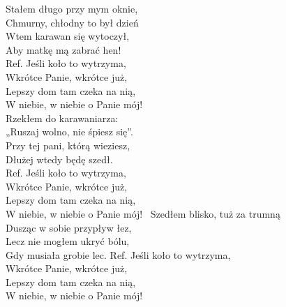 \begin{flushleft}
Stałem długo przy mym oknie, \\
Chmurny, chłodny to był dzień \\
Wtem karawan się wytoczył, \tab{}\\
Aby matkę mą zabrać hen! \tab{}\\
\hops
Ref. Jeśli koło to wytrzyma, \tab{}\\
\hspace{0.9cm}Wkrótce Panie, wkrótce już,\\
\hspace{0.9cm}Lepszy dom tam czeka na nią,\\
\hspace{0.9cm}W niebie, w niebie o Panie mój!\\
\hops
Rzekłem do karawaniarza:\\
„Ruszaj wolno, nie śpiesz się”.\\
Przy tej pani, którą wieziesz,\\
Dłużej wtedy będę szedł.\\
\hops
Ref. Jeśli koło to wytrzyma,\\
\hspace{0.9cm}Wkrótce Panie, wkrótce już,\\
\hspace{0.9cm}Lepszy dom tam czeka na nią,\\
\hspace{0.9cm}W niebie, w niebie o Panie mój!\
\hops
Szedłem blisko, tuż za trumną\\
Dusząc w sobie przypływ łez,\\
Lecz nie mogłem ukryć bólu,\\
Gdy musiała grobie lec.
\hops
Ref. Jeśli koło to wytrzyma,\\
\hspace{0.9cm}Wkrótce Panie, wkrótce już,\\
\hspace{0.9cm}Lepszy dom tam czeka na nią,\\
\hspace{0.9cm}W niebie, w niebie o Panie mój!\\
\end{flushleft}
\newpage